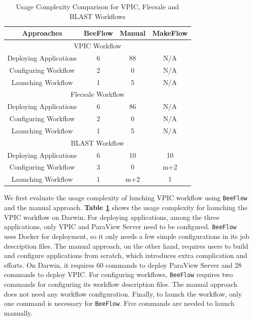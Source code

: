 \begin{table}[]
\centering
\caption{Usage Complexity Comparison for VPIC, Flecsale and BLAST Workflows}
\label{uc}
\begin{tabular}{|c|c|c|c|}
\hline
Approaches             & BeeFlow & Manual & MakeFlow \\ \hline
\multicolumn{4}{|c|}{VPIC Workflow}                  \\ \hline
Deploying Applications & 6       & 88     & N/A      \\ \hline
Configuring Workflow   & 2       & 0      & N/A      \\ \hline
Launching Workflow     & 1       & 5      & N/A      \\ \hline
\multicolumn{4}{|c|}{Flecsale Workflow}              \\ \hline
Deploying Applications & 6       & 86     & N/A      \\ \hline
Configuring Workflow   & 2       & 0      & N/A      \\ \hline
Launching Workflow     & 1       & 5      & N/A      \\ \hline
\multicolumn{4}{|c|}{BLAST Workflow}                 \\ \hline
Deploying Applications & 6       & 10     & 10       \\ \hline
Configuring Workflow   & 3       & 0      & m+2      \\ \hline
Launching Workflow     & 1       & m+2    & 1        \\ \hline
\end{tabular}
\end{table}


We first evaluate the usage complexity of lunching VPIC workflow using \texttt{BeeFlow} and the manual approach. \textbf{Table \ref{uc}} shows the usage complexity for launching the VPIC workflow on Darwin. For deploying applications, among the three applications, only VPIC and ParaView Server need to be configured. \texttt{BeeFlow} uses Docker for deployment, so it only needs a few simple configurations in its job description files. The manual approach, on the other hand, requires users to build and configure applications from scratch, which introduces extra complication and efforts. On Darwin, it requires 60 commands to deploy ParaView Server and 28 commands to deploy VPIC. For configuring workflows, \texttt{BeeFlow} requires two commands for configuring its workflow description files. The manual approach does not need any workflow configuration. Finally, to launch the workflow, only one command is necessary for \texttt{BeeFlow}. Five commands are needed to launch manually. 

